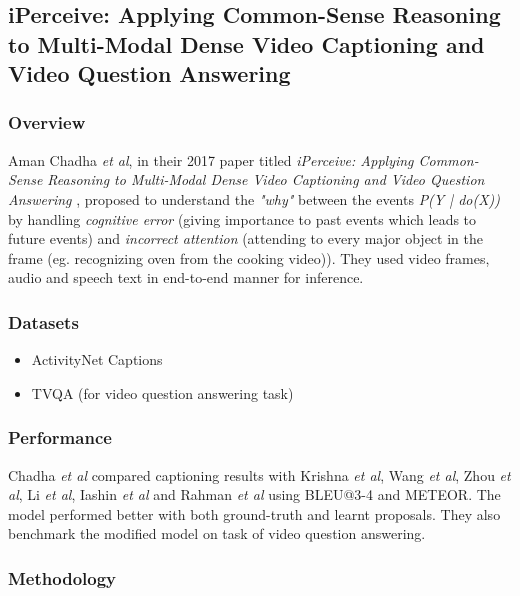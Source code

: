 \subsection{iPerceive: Applying Common-Sense Reasoning to Multi-Modal Dense Video Captioning and Video Question Answering}

\subsubsection{Overview}

\par Aman Chadha \textit{et al}, in their 2017 paper titled \textit{iPerceive: Applying Common-Sense Reasoning to Multi-Modal Dense Video Captioning and Video Question Answering} \cite{chadha2020iperceive}, proposed to understand the \textit{"why"} between the events \textit{P(Y | do(X))} by handling
\textit{cognitive error} (giving importance to past events which leads to future events) and \textit{incorrect attention} (attending to every major object in the frame (eg. recognizing oven from the cooking video)). They used video frames, audio and speech text in end-to-end manner for inference.


\subsubsection{Datasets}
\begin{itemize}
\item ActivityNet Captions
\item TVQA (for video question answering task)
\end{itemize}

\subsubsection{Performance}
\par Chadha \textit{et al} compared captioning results with Krishna \textit{et al}\cite{krishna2017densecaptioning}, Wang \textit{et al}\cite{wang2018bidirectional}, Zhou \textit{et al}\cite{zhou2018end}, Li \textit{et al}\cite{li2018jointly}, Iashin \textit{et al}\cite{iashin2020multimodal} and Rahman \textit{et al}\cite{rahman2019watch} using BLEU@3-4 and METEOR. The model performed better with both ground-truth and learnt proposals. They also benchmark the modified model on task of video question answering. 


\subsubsection{Methodology}

